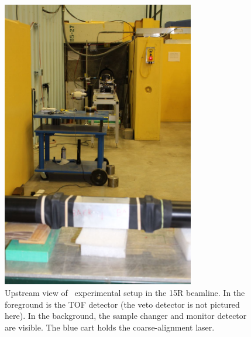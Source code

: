 \begin{figure}[tb]
    \centering
    \includegraphics[width=0.75\textwidth]{figures/UpstreamFromTOFDetector.jpg}
    \caption[Overview of \tot\ experimental setup in the 15R beamline]
    {Upstream view of \tot\ experimental setup in the 15R beamline. In the foreground is the
        TOF detector (the veto detector is not pictured here). In the background, the sample
    changer and monitor detector are visible. The blue cart holds the coarse-alignment laser.}
    \label{BeamlineUpstream}
\end{figure}

